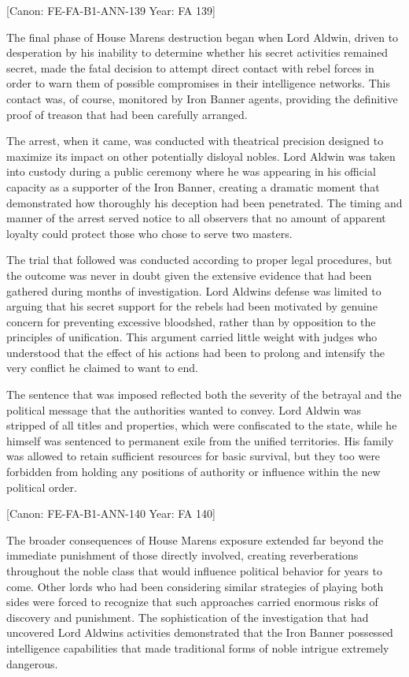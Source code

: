 {[}Canon: FE-FA-B1-ANN-139 \textbar{} Year: FA 139{]}

The final phase of House Maren\textquotesingle s destruction began when
Lord Aldwin, driven to desperation by his inability to determine whether
his secret activities remained secret, made the fatal decision to
attempt direct contact with rebel forces in order to warn them of
possible compromises in their intelligence networks. This contact was,
of course, monitored by Iron Banner agents, providing the definitive
proof of treason that had been carefully arranged.

The arrest, when it came, was conducted with theatrical precision
designed to maximize its impact on other potentially disloyal nobles.
Lord Aldwin was taken into custody during a public ceremony where he was
appearing in his official capacity as a supporter of the Iron Banner,
creating a dramatic moment that demonstrated how thoroughly his
deception had been penetrated. The timing and manner of the arrest
served notice to all observers that no amount of apparent loyalty could
protect those who chose to serve two masters.

The trial that followed was conducted according to proper legal
procedures, but the outcome was never in doubt given the extensive
evidence that had been gathered during months of investigation. Lord
Aldwin\textquotesingle s defense was limited to arguing that his secret
support for the rebels had been motivated by genuine concern for
preventing excessive bloodshed, rather than by opposition to the
principles of unification. This argument carried little weight with
judges who understood that the effect of his actions had been to prolong
and intensify the very conflict he claimed to want to end.

The sentence that was imposed reflected both the severity of the
betrayal and the political message that the authorities wanted to
convey. Lord Aldwin was stripped of all titles and properties, which
were confiscated to the state, while he himself was sentenced to
permanent exile from the unified territories. His family was allowed to
retain sufficient resources for basic survival, but they too were
forbidden from holding any positions of authority or influence within
the new political order.

{[}Canon: FE-FA-B1-ANN-140 \textbar{} Year: FA 140{]}

The broader consequences of House Maren\textquotesingle s exposure
extended far beyond the immediate punishment of those directly involved,
creating reverberations throughout the noble class that would influence
political behavior for years to come. Other lords who had been
considering similar strategies of playing both sides were forced to
recognize that such approaches carried enormous risks of discovery and
punishment. The sophistication of the investigation that had uncovered
Lord Aldwin\textquotesingle s activities demonstrated that the Iron
Banner possessed intelligence capabilities that made traditional forms
of noble intrigue extremely dangerous.

